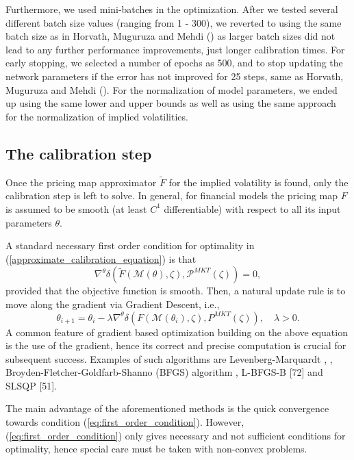 \documentclass{article}
\theoremstyle{remark}
\begin{document}
Furthermore, we used mini-batches in the optimization. After we tested several different batch size values (ranging from 1 - 300),
we reverted to using the same batch size as in Horvath, Muguruza and Mehdi (\cite{HMM19}) as larger batch sizes did not lead to
any further performance improvements, just longer calibration times.
For early stopping, we selected a number of epochs as 500, and to stop updating the network parameters
if the error has not improved for 25 steps, same as Horvath, Muguruza and Mehdi (\cite{HMM19}).
For the normalization of model parameters, we ended up using the same lower and upper bounds as well as using the same approach
for the normalization of implied volatilities.

\subsection{The calibration step}
\label{sec:calibrationStep}

Once the pricing map approximator $\widetilde{F}$  for the implied volatility
is found, only the calibration step is left to solve.
In general, for financial models the pricing map $F$ is assumed to be smooth
(at least $C^1$ differentiable) with respect to all its input parameters $\theta$.

A standard necessary first order condition for optimality in (\ref{approximate_calibration_equation}) is that
\begin{equation}\label{eq:first_order_condition}
\nabla^{\theta} \delta \left( \widetilde{F}(\mathcal{M}(\theta), \zeta), \mathcal{P}^{MKT} (\zeta) \right) = 0,
\end{equation}
provided that the objective function is smooth.
Then, a natural update rule is to move along the gradient via Gradient Descent, i.e.,
\begin{equation}\label{eq:gradient_descent}
\theta_{i+1} = \theta_{i} - \lambda \nabla^{\theta} \delta \left(F(\mathcal{M}(\theta_{i}), \zeta), P^{MKT}(\zeta) \right), \quad \lambda > 0.
\end{equation}
A common feature of gradient based optimization building on the above equation is the use of the gradient,
hence its correct and precise computation is crucial for subsequent success.
Examples of such algorithms are Levenberg-Marquardt \cite{Levenberg}, \cite{Marquardt},
Broyden-Fletcher-Goldfarb-Shanno (BFGS) algorithm \cite{BFGHS}, L-BFGS-B [72] and SLSQP [51].

The main advantage of the aforementioned methods is the quick convergence towards condition (\ref{eq:first_order_condition}).
However, (\ref{eq:first_order_condition}) only gives necessary and not sufficient conditions for optimality,
hence special care must be taken with non-convex problems.
\end{document}
